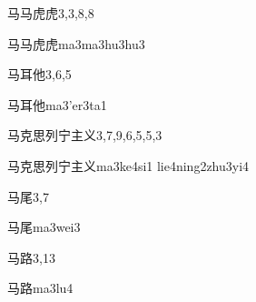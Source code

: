 \begin{entry}{马马虎虎}{3,3,8,8}
  \begin{phonetics}{马马虎虎}{ma3ma3hu3hu3}
  \end{phonetics}
\end{entry}

\begin{entry}{马耳他}{3,6,5}
  \begin{phonetics}{马耳他}{ma3'er3ta1}
  \end{phonetics}
\end{entry}

\begin{entry}{马克思列宁主义}{3,7,9,6,5,5,3}
  \begin{phonetics}{马克思列宁主义}{ma3ke4si1 lie4ning2zhu3yi4}
  \end{phonetics}
\end{entry}

\begin{entry}{马尾}{3,7}
  \begin{phonetics}{马尾}{ma3wei3}
  \end{phonetics}
\end{entry}

\begin{entry}{马路}{3,13}
  \begin{phonetics}{马路}{ma3lu4}
  \end{phonetics}
\end{entry}


